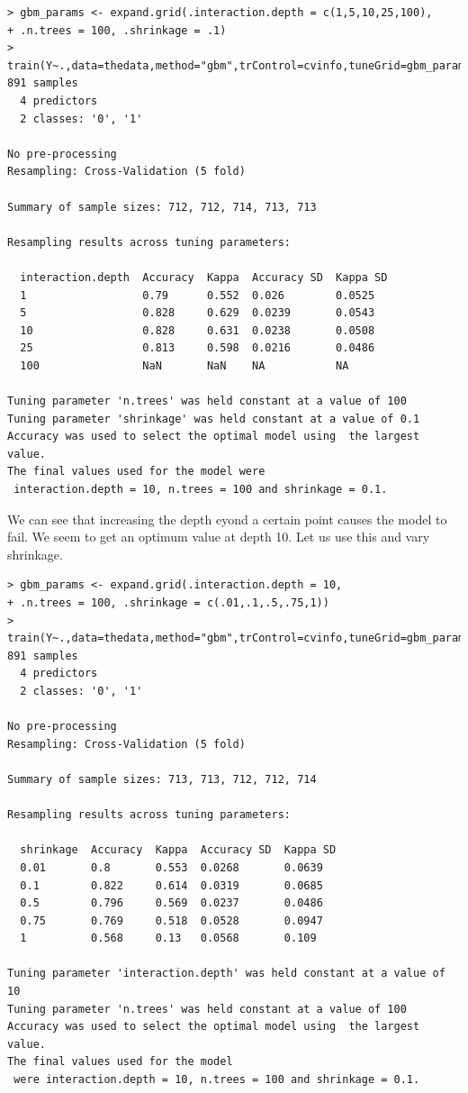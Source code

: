 \documentclass[fontsize=10pt]{scrartcl}
\begin{document}
\begin{enumerate}
\begin{verbatim}
> gbm_params <- expand.grid(.interaction.depth = c(1,5,10,25,100),
+ .n.trees = 100, .shrinkage = .1)
> train(Y~.,data=thedata,method="gbm",trControl=cvinfo,tuneGrid=gbm_params)
891 samples
  4 predictors
  2 classes: '0', '1' 

No pre-processing
Resampling: Cross-Validation (5 fold) 

Summary of sample sizes: 712, 712, 714, 713, 713 

Resampling results across tuning parameters:

  interaction.depth  Accuracy  Kappa  Accuracy SD  Kappa SD
  1                  0.79      0.552  0.026        0.0525  
  5                  0.828     0.629  0.0239       0.0543  
  10                 0.828     0.631  0.0238       0.0508  
  25                 0.813     0.598  0.0216       0.0486  
  100                NaN       NaN    NA           NA      

Tuning parameter 'n.trees' was held constant at a value of 100
Tuning parameter 'shrinkage' was held constant at a value of 0.1
Accuracy was used to select the optimal model using  the largest value.
The final values used for the model were
 interaction.depth = 10, n.trees = 100 and shrinkage = 0.1. 
\end{verbatim}

			We can see that increasing the depth eyond a certain point causes the model to fail. We seem to get an optimum value at depth 10. Let us use this and vary shrinkage.
\begin{verbatim}
> gbm_params <- expand.grid(.interaction.depth = 10,
+ .n.trees = 100, .shrinkage = c(.01,.1,.5,.75,1))
> train(Y~.,data=thedata,method="gbm",trControl=cvinfo,tuneGrid=gbm_params)
891 samples
  4 predictors
  2 classes: '0', '1' 

No pre-processing
Resampling: Cross-Validation (5 fold) 

Summary of sample sizes: 713, 713, 712, 712, 714 

Resampling results across tuning parameters:

  shrinkage  Accuracy  Kappa  Accuracy SD  Kappa SD
  0.01       0.8       0.553  0.0268       0.0639  
  0.1        0.822     0.614  0.0319       0.0685  
  0.5        0.796     0.569  0.0237       0.0486  
  0.75       0.769     0.518  0.0528       0.0947  
  1          0.568     0.13   0.0568       0.109   

Tuning parameter 'interaction.depth' was held constant at a value of 10
Tuning parameter 'n.trees' was held constant at a value of 100
Accuracy was used to select the optimal model using  the largest value.
The final values used for the model
 were interaction.depth = 10, n.trees = 100 and shrinkage = 0.1. 
\end{verbatim}


\end{enumerate}
\end{document}
